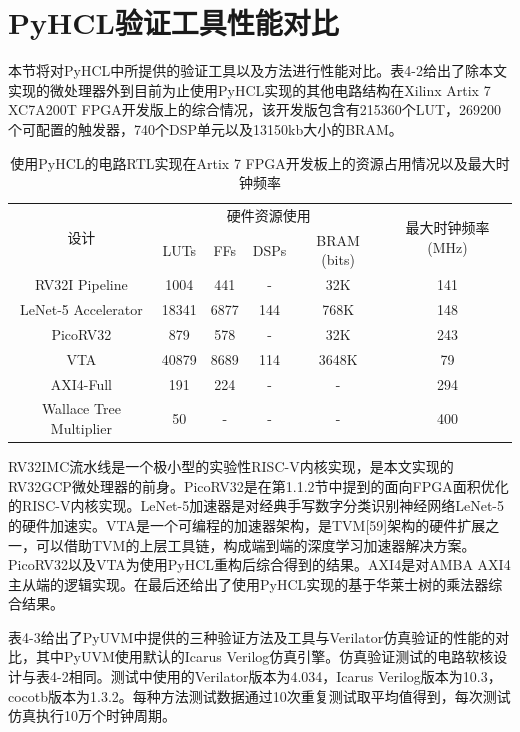 \section{PyHCL验证工具性能对比}

本节将对PyHCL中所提供的验证工具以及方法进行性能对比。表4-2给出了除本文实现的微处理器外到目前为止使用PyHCL实现的其他电路结构在Xilinx Artix 7 XC7A200T FPGA开发版上的综合情况，该开发版包含有215360个LUT，269200个可配置的触发器，740个DSP单元以及13150kb大小的BRAM。

\begin{table}
	\caption{使用PyHCL的电路RTL实现在Artix 7 FPGA开发板上的资源占用情况以及最大时钟频率}
	\centering
	\begin{tabular}{cccccc}
		\toprule
		\multirow{2}[2]{*}{设计} & \multicolumn{4}{c}{硬件资源使用} & \multicolumn{1}{c}{\multirow{2}[2]{*}{最大时钟频率 (MHz)}} \\
		\cmidrule{2-5}          & LUTs  & FFs   & DSPs  & \multicolumn{1}{c}{BRAM (bits)} &  \\
		\midrule
		RV32I Pipeline & 1004  & 441   & -     & 32K   & 141 \\
		LeNet-5 Accelerator & 18341 & 6877  & 144   & 768K  & 148 \\
		PicoRV32 & 879   & 578   & -     & 32K   & 243 \\
		VTA   & 40879 & 8689  & 114   & 3648K & 79 \\
		AXI4-Full & 191   & 224   & -     & -     & 294 \\
		Wallace Tree Multiplier & 50    & -     & -     & -     & 400 \\
		\bottomrule
	\end{tabular}%
\end{table}%

RV32IMC流水线是一个极小型的实验性RISC-V内核实现，是本文实现的RV32GCP微处理器的前身。PicoRV32是在第1.1.2节中提到的面向FPGA面积优化的RISC-V内核实现。LeNet-5加速器是对经典手写数字分类识别神经网络LeNet-5的硬件加速实。VTA是一个可编程的加速器架构，是TVM[59]架构的硬件扩展之一，可以借助TVM的上层工具链，构成端到端的深度学习加速器解决方案。PicoRV32以及VTA为使用PyHCL重构后综合得到的结果。AXI4是对AMBA AXI4主从端的逻辑实现。在最后还给出了使用PyHCL实现的基于华莱士树的乘法器综合结果。

表4-3给出了PyUVM中提供的三种验证方法及工具与Verilator仿真验证的性能的对比，其中PyUVM使用默认的Icarus Verilog仿真引擎。仿真验证测试的电路软核设计与表4-2相同。测试中使用的Verilator版本为4.034，Icarus Verilog版本为10.3，cocotb版本为1.3.2。每种方法测试数据通过10次重复测试取平均值得到，每次测试仿真执行10万个时钟周期。

